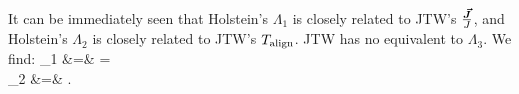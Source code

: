 It can be immediately seen that Holstein's $\Lambda_1$ is closely related to JTW's $\frac{\bm{\vec{J}}}{J}$, and 
Holstein's $\Lambda_2$ is closely related to JTW's $T_{\mathrm{align}}$.  JTW has no equivalent to $\Lambda_3$.  We find:
\bea
\Lambda_1 \hatj &=& \LambdaOne \hatj \;\; = \;\;   \\
\Lambda_2 &=& \Talign {}.
\eea




